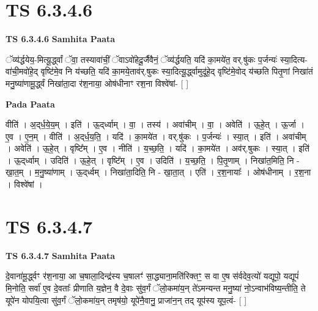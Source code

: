 \documentclass[17pt]{extarticle}
\begin{document}
\section*{ TS 6.3.4.6 }

\textbf{TS 6.3.4.6 } \newline
\textbf{Samhita Paata} \newline

ॅव्य॑र्द्धयेय॒-मित्यू॒र्द्ध्वां ॅवा॒ तस्यावा॑चीं॒ ॅवाऽवो॑हेदू॒र्जैवैनं॒ ॅव्य॑र्द्धयति॒ यदि॑ का॒मये॑त॒ वर्.षु॑कः प॒र्जन्यः॑ स्या॒दित्य-वा॑ची॒मवो॑हे॒द् वृष्टि॑मे॒व नि य॑च्छति॒ यदि॑ का॒मये॒ताव॑र्.षुकः स्या॒दित्यू॒र्द्ध्वामुदू॑हे॒द् वृष्टि॑मे॒वोद् य॑च्छति पितृ॒णां निखा॑तं मनु॒ष्या॑णामू॒र्द्ध्वं निखा॑ता॒दा र॑श॒नाया॒ ओष॑धीनाꣳ रश॒ना विश्वे॑षां- [  ] \newline

\textbf{Pada Paata} \newline

वीति॑ । अ॒द्‌र्ध॒ये॒य॒म् । इति॑ । ऊ॒द्‌र्ध्वाम् । वा॒ । तस्य॑ । अवा॑चीम् । वा॒ । अवेति॑ । ऊ॒हे॒त् । ऊ॒र्जा । ए॒व । ए॒न॒म् । वीति॑ । अ॒द्‌र्ध॒य॒ति॒ । यदि॑ । का॒मये॑त । वर्.षु॑कः । प॒र्जन्यः॑ । स्या॒त् । इति॑ । अवा॑चीम् । अवेति॑ । ऊ॒हे॒त् । वृष्टि᳚म् । ए॒व । नीति॑ । य॒च्छ॒ति॒ । यदि॑ । का॒मये॑त । अव॑र्.षुकः । स्या॒त् । इति॑ । ऊ॒द्‌र्ध्वाम् । उदिति॑ । ऊ॒हे॒त् । वृष्टि᳚म् । ए॒व । उदिति॑ । य॒च्छ॒ति॒ । पि॒तृ॒णाम् । निखा॑त॒मिति॒ नि - खा॒त॒म् । म॒नु॒ष्या॑णाम् । ऊ॒द्‌र्ध्वम् । निखा॑ता॒दिति॒ नि - खा॒ता॒त् । एति॑ । र॒श॒नायाः᳚ । ओष॑धीनाम् । र॒श॒ना । विश्वे॑षां ।  \newline




\section*{ TS 6.3.4.7 }

\textbf{TS 6.3.4.7 } \newline
\textbf{Samhita Paata} \newline

दे॒वाना॑मू॒र्द्ध्वꣳ र॑श॒नाया॒ आ च॒षाला॒दिन्द्र॑स्य च॒षालꣳ॑ सा॒द्ध्याना॒मति॑रिक्तꣳ॒॒ स वा ए॒ष स॑र्वदेव॒त्यो॑ यद्यूपो॒ यद्यूपं॑ मि॒नोति॒ सर्वा॑ ए॒व दे॒वताः᳚ प्रीणाति य॒ज्ञेन॒ वै दे॒वाः सु॑व॒र्गं ॅलो॒कमा॑य॒न् ते॑ऽमन्यन्त मनु॒ष्या॑ नो॒ऽन्वाभ॑विष्य॒न्तीति॒ ते यूपे॑न योपयि॒त्वा सु॑व॒र्गं ॅलो॒कमा॑य॒न् तमृष॑यो॒ यूपे॑नै॒वानु॒ प्राजा॑न॒न् तद् यूप॑स्य यूप॒त्वं- [  ] \newline
\end{document}
